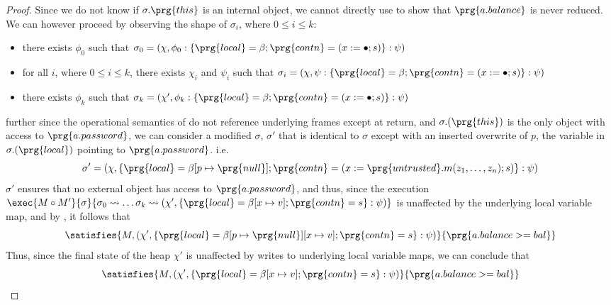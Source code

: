 \begin{proof}
Since we do not know if $\sigma.\prg{this}$ is an internal object, we cannot directly use \SrobustB to show that $\prg{a.balance}$ is never reduced. 
We can however proceed by observing the shape of $\sigma_i$, where $0 \leq i \leq k$:
\begin{itemize}
\item
there exists $\phi_0$ such that $\sigma_0 = (\chi, \phi_0 : \{\prg{local} = \beta; \prg{contn} = (x := \bullet; s)\} : \psi)$ 
\item
for all $i$, where $0 \leq i \leq k$, there exists $\chi_i$ and $\psi_i$ such that $\sigma_i = (\chi, \psi : \{\prg{local} = \beta; \prg{contn} = (x := \bullet; s)\} : \psi)$
\item
there exists $\phi_k$ such that $\sigma_k = (\chi', \phi_k : \{\prg{local} = \beta; \prg{contn} = (x := \bullet; s)\} : \psi)$
\end{itemize}
further since the operational semantics of \Loo do not reference underlying frames except at return, and $\sigma.(\prg{this})$ is the
only object with access to $\prg{a.password}$, we can consider a modified $\sigma$, $\sigma'$ that 
is identical to $\sigma$ except with an inserted overwrite of $p$, the variable in $\sigma.(\prg{local})$ pointing to $\prg{a.password}$.
i.e. $$\sigma' = (\chi, \{\prg{local} = \beta[p \mapsto \prg{null}]; \prg{contn} = (x := \prg{untrusted}.m(z_1, \ldots, z_n); s)\} : \psi)$$
$\sigma'$ ensures that no external object has access to $\prg{a.password}$, and thus, 
since the execution $\exec{M \circ M'}{\sigma}{\sigma_0 \leadsto \ldots \sigma_k \leadsto (\chi', \{\prg{local} = \beta[x \mapsto v]; \prg{contn} = s\} : \psi)}$
is unaffected by the underlying local variable map, and by {\SrobustB}, it follows that 
$$\satisfies{M, (\chi', \{\prg{local} = \beta[p \mapsto \prg{null}][x \mapsto v]; \prg{contn} = s\} : \psi)}{\prg{a.balance >= bal}}$$
Thus, since the final state of the heap $\chi'$ is unaffected by writes to underlying local variable maps, we can conclude that
$$\satisfies{M, (\chi', \{\prg{local} = \beta[x \mapsto v]; \prg{contn} = s\} : \psi)}{\prg{a.balance >= bal}}$$
\end{proof}
